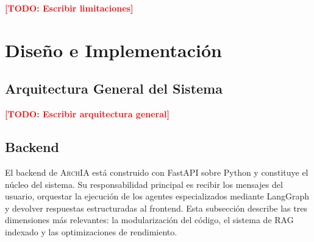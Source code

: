 \documentclass[12pt, letterpaper, oneside]{article}
\newcommand{\archia}{\textsc{ArchIA}}
\newcommand{\TODO}[1]{\textcolor{red}{\textbf{[TODO: #1]}}}
\begin{document}
\TODO{Escribir limitaciones}


\section{Diseño e Implementación}
\label{sec:diseno}


\subsection{Arquitectura General del Sistema}
\label{subsec:arquitectura-general}


\TODO{Escribir arquitectura general}


\subsection{Backend}
\label{subsec:backend}


El backend de \archia{} está construido con FastAPI sobre Python y constituye el
núcleo del sistema. Su responsabilidad principal es recibir los mensajes del
usuario, orquestar la ejecución de los agentes especializados mediante LangGraph
y devolver respuestas estructuradas al frontend. Esta subsección describe las tres
dimensiones más relevantes: la modularización del código, el sistema de RAG indexado
y las optimizaciones de rendimiento.
\end{document}
